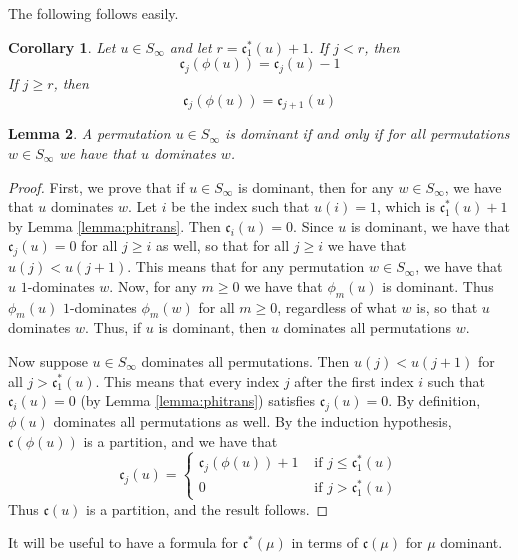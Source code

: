 \documentclass[reqno]{amsart}
\newtheorem{lemma}{Lemma}[subsection]
\newtheorem{corollary}[lemma]{Corollary}
\theoremstyle{definition}
\theoremstyle{remark}
\numberwithin{equation}{subsection}
\newcommand{\code}{\mathfrak{c}}
\begin{document}
The following follows easily.

\begin{corollary} \label{corollary:subtractcode}
	Let $u\in S_\infty$ and let $r=\code_1^*(u)+1$. If $j<r$, then
	$$\code_j(\phi(u))=\code_j(u)-1$$
	If $j\geq r$, then
	$$\code_j(\phi(u))=\code_{j+1}(u)$$
\end{corollary}




\begin{lemma} \label{lemma:domdom}
A permutation $u\in S_\infty$ is dominant if and only if for all permutations $w\in S_\infty$ we have that $u$ dominates $w$.
\end{lemma}
\begin{proof}
First, we prove that if $u\in S_\infty$ is dominant, then for any $w\in S_\infty$, we have that $u$ dominates $w$. Let $i$ be the index such that $u(i)=1$, which is $\code_1^*(u)+1$ by Lemma \ref{lemma:phitrans}. Then $\code_i(u)=0$. Since $u$ is dominant, we have that $\code_j(u)=0$ for all $j\geq i$ as well, so that for all $j\geq i$ we have that $u(j)<u(j+1)$. This means that for any permutation $w\in S_\infty$, we have that $u$ $1$-dominates $w$. Now, for any $m\geq 0$ we have that $\phi_m(u)$ is dominant. Thus $\phi_m(u)$ $1$-dominates $\phi_m(w)$ for all $m\geq 0$, regardless of what $w$ is, so that $u$ dominates $w$. Thus, if $u$ is dominant, then $u$ dominates all permutations $w$.

Now suppose $u\in S_\infty$ dominates all permutations. Then $u(j)<u(j+1)$ for all $j>\code_1^*(u)$. This means that every index $j$ after the first index $i$ such that $\code_i(u)=0$ (by Lemma \ref{lemma:phitrans}) satisfies $\code_j(u)=0$. By definition, $\phi(u)$ dominates all permutations as well. By the induction hypothesis, $\code(\phi(u))$ is a partition, and we have that 
$$\code_j(u)=\begin{cases}
\code_j(\phi(u))+1&\mbox{ if }j\leq\code_1^*(u)\\
0&\mbox{ if }j>\code_1^*(u)
\end{cases}$$
Thus $\code(u)$ is a partition, and the result follows.
\end{proof}


It will be useful to have a formula for $\code^*(\mu)$ in terms of $\code(\mu)$ for $\mu$ dominant.
\end{document}

